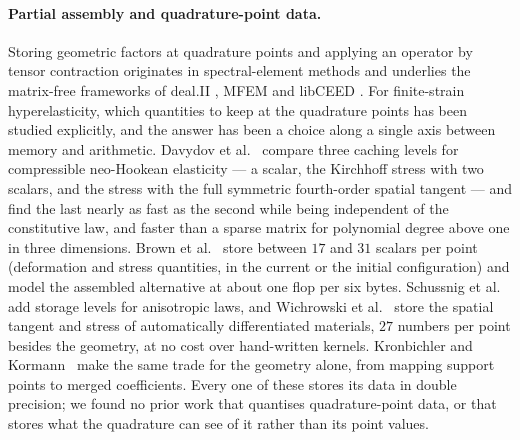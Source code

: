 \documentclass[sigconf,balance=false]{acmart}
\begin{document}
\paragraph{Partial assembly and quadrature-point data.}  Storing geometric factors at quadrature
points and applying an operator by tensor contraction originates in spectral-element methods
\cite{Orszag1980,DevilleFischerMund2002} and underlies the matrix-free frameworks of deal.II
\cite{KronbichlerKormann2012}, MFEM \cite{MFEM2021} and libCEED \cite{libCEED2021}.  For
finite-strain hyperelasticity, which quantities to keep at the quadrature points has been studied
explicitly, and the answer has been a choice along a single axis between memory and arithmetic.
Davydov et al.~\cite{Davydov2020} compare three caching levels for compressible neo-Hookean
elasticity --- a scalar, the Kirchhoff stress with two scalars, and the stress with the full
symmetric fourth-order spatial tangent --- and find the last nearly as fast as the second while
being independent of the constitutive law, and faster than a sparse matrix for polynomial degree
above one in three dimensions.  Brown et al.~\cite{Brown2022} store between $17$ and $31$ scalars
per point (deformation and stress quantities, in the current or the initial configuration) and
model the assembled alternative at about one flop per six bytes.  Schussnig et
al.~\cite{Schussnig2025} add storage levels for anisotropic laws, and Wichrowski et
al.~\cite{Wichrowski2025} store the spatial tangent and stress of automatically differentiated
materials, $27$ numbers per point besides the geometry, at no cost over hand-written kernels.
Kronbichler and Kormann~\cite{KronbichlerKormann2019} make the same trade for the geometry alone,
from mapping support points to merged coefficients.  Every one of these stores its data in double
precision; we found no prior work that quantises quadrature-point data, or that stores what the
quadrature can see of it rather than its point values.
\end{document}
